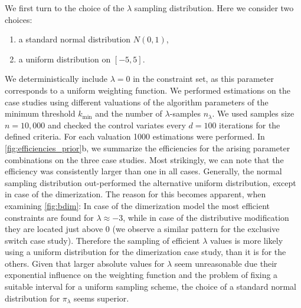 We first turn to the choice of the $\lambda$ sampling distribution. Here we
consider two choices:
\begin{enumerate}
    \item a standard normal distribution $N(0,1)$,
    \item a uniform distribution on $[-5,5]$.
\end{enumerate}
We deterministically include $\lambda=0$ in the constraint set, as this parameter
corresponds to a uniform weighting function.
We performed estimations on the case studies using different valuations of the
algorithm parameters of the minimum threshold $k_{\min}$ and
the number of $\lambda$-samples $n_{\lambda}$.
We used samples size $n=10,\!000$ and checked the control  variates every $d=100$ iterations
for the defined criteria.
For each valuation 1000 estimations were performed.
In \autoref{fig:efficiencies_prior}b, we summarize the efficiencies
for the arising parameter combinations on the three case studies.
Most strikingly, we can note that the efficiency was consistently larger than one in
all cases.
Generally, the normal sampling distribution out-performed the 
alternative uniform distribution, except in case of the dimerization.
The reason for this becomes apparent, when examining \autoref{fig:bdim}:
In case of the dimerization model the most efficient constraints are found for
$\lambda\approx -3$, while in case of the distributive modification they are located
 just above 0 (we observe a similar pattern for the exclusive switch case study).
Therefore the sampling of efficient $\lambda$ values is more likely
using a uniform distribution for the dimerization case study, than it is for the others.
Given that larger absolute values for $\lambda$ seem unreasonable due 
their exponential influence on the weighting function and the problem of fixing
a suitable interval for a uniform sampling scheme, the choice of a standard normal
distribution for $\pi_{\lambda}$ seems superior.
